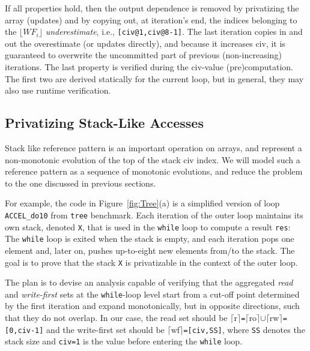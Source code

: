 \documentclass[10pt,nocopyrightspace]{sigplanconf}
\begin{document}
If all properties hold, then the output dependence is removed 
by privatizing the array (updates) and by copying out, at 
iteration's end, the indices belonging to the $\lfloor WF_i\rfloor$ 
{\em underestimate}, i.e., {\tt[civ@1,civ@8-1]}.
The last iteration copies in and out the overestimate (or updates directly),
and because it increases {\sc civ}, it is guaranteed to overwrite the 
uncommitted part of previous (non-increasing) iterations.
%
The last property is verified during the {\sc civ}-value
(pre)computation. The first two are derived statically for the current 
loop, but in general, they may also use runtime verification.


\subsection{Privatizing Stack-Like Accesses} 
\label{sec:Stack}

Stack like reference pattern is an important operation on arrays,
and represent a non-monotonic evolution of the top of the stack 
{\sc civ} index. 
We will model such a reference pattern as a sequence of monotonic
evolutions, and reduce the problem to the one discussed in previous 
sections.

 
For example, the code in Figure~\ref{fig:Tree}(a) is a simplified
version of loop {\tt ACCEL\_do10} from {\tt tree} benchmark. 
Each iteration of the outer loop maintains its own
stack, denoted {\tt X}, that is used in the {\tt while} loop to 
compute a result {\tt res}:
The {\tt while} loop is exited when the stack is empty, and each
iteration pops one element and, later on, pushes
up-to-eight new elements from/to the stack. 
%
The goal is to prove that the stack {\tt X} is privatizable in the
context of the outer loop.   

The plan is to devise an analysis capable of verifying that the
aggregated {\em read} and {\em write-first} sets at the {\tt while}-loop 
level start from a cut-off point determined by the first iteration %
and expand monotonically, but in opposite directions, such that 
they do not overlap. In our case, the read set should be
$\lceil${\sc r}$\rceil${\tt=}$\lceil${\sc ro}$\rceil$$\cup$$\lceil${\sc rw}$\rceil${\tt=[0,civ-1]}
and the write-first set should be $\lceil${\sc wf}$\rceil${\tt=[civ,SS]},
where {\tt SS} denotes the stack size and  {\tt civ=1} is the value 
before entering the {\tt while} loop.
\end{document}
